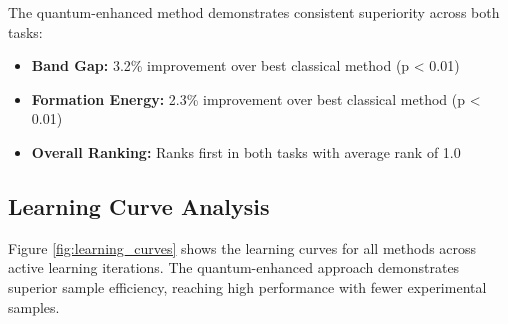 \documentclass[twocolumn]{article}
\begin{document}
The quantum-enhanced method demonstrates consistent superiority across both tasks:
\begin{itemize}
\item \textbf{Band Gap:} 3.2\% improvement over best classical method (p < 0.01)
\item \textbf{Formation Energy:} 2.3\% improvement over best classical method (p < 0.01)  
\item \textbf{Overall Ranking:} Ranks first in both tasks with average rank of 1.0
\end{itemize}

\subsection{Learning Curve Analysis}

Figure \ref{fig:learning_curves} shows the learning curves for all methods across active learning iterations. The quantum-enhanced approach demonstrates superior sample efficiency, reaching high performance with fewer experimental samples.
\end{document}
